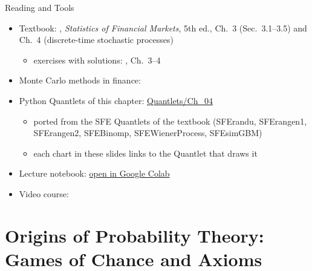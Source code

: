 \begin{frame}{Reading and Tools}
\itemsize{\small}
\begin{itemize}
    \item Textbook: , \textit{Statistics of Financial Markets}, 5th ed., Ch.~3 (Sec.~3.1--3.5) and Ch.~4 (discrete-time stochastic processes)
    \begin{itemize}
        \item exercises with solutions: , Ch.~3--4
    \end{itemize}
    \item Monte Carlo methods in finance: 
    \item Python Quantlets of this chapter: \href{https://github.com/danpele/SFM/tree/main/Quantlets/Ch_04}{Quantlets/Ch\_04}
    \begin{itemize}
        \item ported from the SFE Quantlets of the textbook (SFErandu, SFErangen1, SFErangen2, SFEBinomp, SFEWienerProcess, SFEsimGBM)
        \item each chart in these slides links to the Quantlet that draws it
    \end{itemize}
    \item Lecture notebook: \href{\colaburl{notebooks/EN/chapter4_lecture_notebook.ipynb}}{open in Google Colab}
    \item Video course: 
\end{itemize}
\end{frame}


\section{Origins of Probability Theory: Games of Chance and Axioms}

